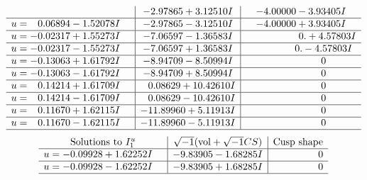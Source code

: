 \documentclass[1p]{elsarticle_modified}
\theoremstyle{definition}
\newcommand{\I}{\sqrt{-1}}
\begin{document}
$$\begin{array}{c|c|c}
 & -2.97865 + 3.12510 I & -4.00000 - 3.93405 I \\ \hline\begin{aligned}
u &= \phantom{-}0.06894 - 1.52078 I\end{aligned}
 & -2.97865 - 3.12510 I & -4.00000 + 3.93405 I \\ \hline\begin{aligned}
u &= -0.02317 + 1.55273 I\end{aligned}
 & -7.06597 - 1.36583 I & \phantom{-0.000000 -}0. + 4.57803 I \\ \hline\begin{aligned}
u &= -0.02317 - 1.55273 I\end{aligned}
 & -7.06597 + 1.36583 I & \phantom{-0.000000 } 0. - 4.57803 I \\ \hline\begin{aligned}
u &= -0.13063 + 1.61792 I\end{aligned}
 & -8.94709 - 8.50994 I & \phantom{-0.000000 } 0 \\ \hline\begin{aligned}
u &= -0.13063 - 1.61792 I\end{aligned}
 & -8.94709 + 8.50994 I & \phantom{-0.000000 } 0 \\ \hline\begin{aligned}
u &= \phantom{-}0.14214 + 1.61709 I\end{aligned}
 & \phantom{-}0.08629 + 10.42610 I & \phantom{-0.000000 } 0 \\ \hline\begin{aligned}
u &= \phantom{-}0.14214 - 1.61709 I\end{aligned}
 & \phantom{-}0.08629 - 10.42610 I & \phantom{-0.000000 } 0 \\ \hline\begin{aligned}
u &= \phantom{-}0.11670 + 1.62115 I\end{aligned}
 & -11.89960 + 5.11913 I & \phantom{-0.000000 } 0 \\ \hline\begin{aligned}
u &= \phantom{-}0.11670 - 1.62115 I\end{aligned}
 & -11.89960 - 5.11913 I & \phantom{-0.000000 } 0\\
 \hline 
 \end{array}$$\newpage$$\begin{array}{c|c|c}  
\text{Solutions to }I^u_{1}& \I (\text{vol} + \sqrt{-1}CS) & \text{Cusp shape}\\
 \hline 
\begin{aligned}
u &= -0.09928 + 1.62252 I\end{aligned}
 & -9.83905 - 1.68285 I & \phantom{-0.000000 } 0 \\ \hline\begin{aligned}
u &= -0.09928 - 1.62252 I\end{aligned}
 & -9.83905 + 1.68285 I & \phantom{-0.000000 } 0\\
 \hline 
 \end{array}$$\newpage\newpage\renewcommand{\arraystretch}{1}
\end{document}
